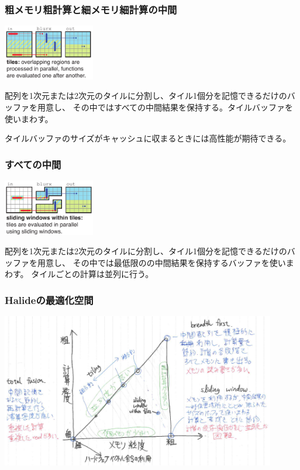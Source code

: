 \documentclass[dvipdfmx,cjk]{beamer}
\begin{document}
\begin{frame}\frametitle{粗メモリ粗計算と細メモリ細計算の中間}


\begin{center}
\includegraphics[width=4cm]{figure/doc/blur-tiles.png}
\end{center}

配列を1次元または2次元のタイルに分割し、タイル1個分を記憶できるだけのバッファを用意し、
その中ではすべての中間結果を保持する。タイルバッファを使いまわす。

タイルバッファのサイズがキャッシュに収まるときには高性能が期待できる。

\end{frame}

\begin{frame}\frametitle{すべての中間}


\begin{center}
\includegraphics[width=4cm]{figure/doc/blur-sliding-within-tiles.png}
\end{center}

配列を1次元または2次元のタイルに分割し、タイル1個分を記憶できるだけのバッファを用意し、
その中では最低限のの中間結果を保持するバッファを使いまわす。
タイルごとの計算は並列に行う。



\end{frame}


\begin{frame}\frametitle{Halideの最適化空間}

\begin{center}
\includegraphics[width=12cm]{figure/doc/schedule-space.png}
\end{center}
\end{frame}
\end{document}
